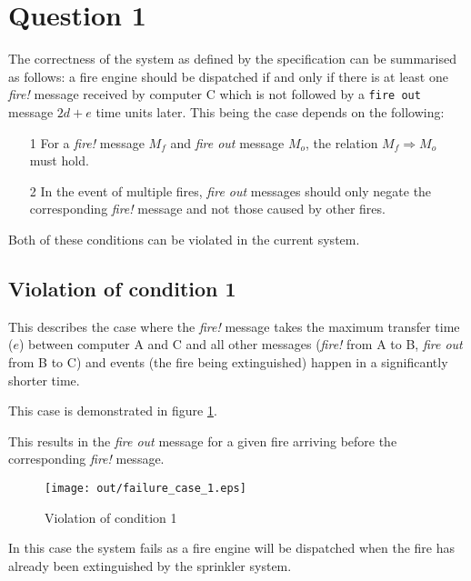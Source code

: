\documentclass[twocolumn]{article}
\title{\DOCTITLE}
\author{\DOCAUTHOR}
\date{\DOCDATE}
\begin{document}
\section{Question 1}

The correctness of the system as defined by the specification can be summarised
as follows: a fire engine should be dispatched if and only if there is at least
one \textit{fire!} message received by computer C which is not followed by a
\texttt{fire out} message $2d + e$ time units later. This being the case depends
on the following:

\begin{enumerate}
  \item[1] For a \textit{fire!} message $M_{f}$ and \textit{fire out} message
           $M_{o}$, the relation $M_{f} \Rightarrow M_{o}$ must hold.
  \item[2] In the event of multiple fires, \textit{fire out} messages should
           only negate the corresponding \textit{fire!} message and not those
           caused by other fires.
\end{enumerate}

Both of these conditions can be violated in the current system.

\subsection{Violation of condition 1}
\label{sec:violation_of_condition_1}

This describes the case where the \textit{fire!} message takes the maximum
transfer time ($e$) between computer A and C and all other messages
(\textit{fire!} from A to B, \textit{fire out} from B to C) and events (the fire
being extinguished) happen in a significantly shorter time.

This case is demonstrated in figure \ref{fig:failure_case_1}.

This results in the \textit{fire out} message for a given fire arriving before
the corresponding \textit{fire!} message.

\begin{figure}[h!]
  \centering
  \texttt{[image: out/failure\_case\_1.eps]}
  \caption{Violation of condition 1}
  \label{fig:failure_case_1}
\end{figure}

In this case the system fails as a fire engine will be dispatched when the fire
has already been extinguished by the sprinkler system.
\end{document}

